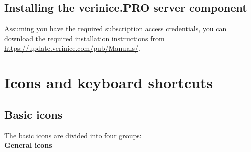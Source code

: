 \documentclass[a4paper,10pt]{book}
\begin{document}
\section{Installing the verinice.PRO server component}
Assuming you have the required subscription access credentials, you
can download the required installation instructions from
\url{https://update.verinice.com/pub/Manuals/}.

\chapter{Icons and keyboard shortcuts}
\section{Basic icons}
The basic icons are divided into four groups:
\newline\\
\textbf{General icons}
\end{document}
